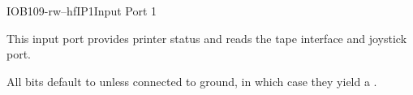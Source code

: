 \begin{ioport}{IOB}{109}{-rw--hf}{IP1}{Input Port 1}
  
  This input port provides printer status and reads the tape interface and
  joystick port.

  \begin{cbitfield}
  \end{cbitfield}

  All bits default to  unless connected to ground, in which case they
  yield a .


\end{ioport}
